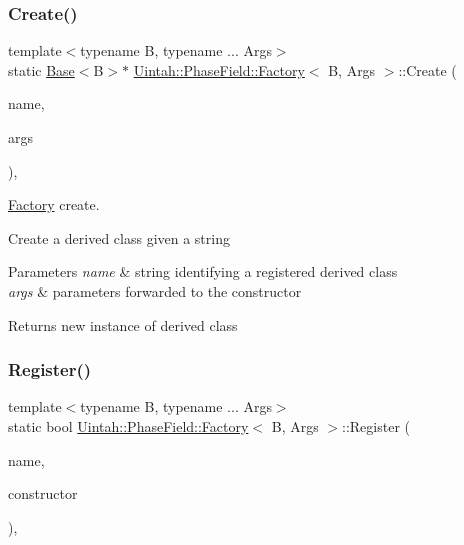 \subsubsection{\texorpdfstring{Create()}{Create()}}
{\footnotesize\ttfamily template$<$typename B, typename ... Args$>$ \\
static \hyperlink{classUintah_1_1PhaseField_1_1Base}{Base}$<$B$>$$\ast$ \hyperlink{classUintah_1_1PhaseField_1_1Factory}{Uintah\+::\+Phase\+Field\+::\+Factory}$<$ B, Args $>$\+::Create (\begin{DoxyParamCaption}\item[{std\+::string}]{name,  }\item[{Args ...}]{args }\end{DoxyParamCaption})\hspace{0.3cm}{\ttfamily [inline]}, {\ttfamily [static]}}



\hyperlink{classUintah_1_1PhaseField_1_1Factory}{Factory} create. 

Create a derived class given a string


\begin{DoxyParams}{Parameters}
{\em name} & string identifying a registered derived class \\
\hline
{\em args} & parameters forwarded to the constructor \\
\hline
\end{DoxyParams}
\begin{DoxyReturn}{Returns}
new instance of derived class 
\end{DoxyReturn}
\mbox{\label{classUintah_1_1PhaseField_1_1Factory_a52c2dbc3f693413bbd5d1338fa01e3bf}} 
\subsubsection{\texorpdfstring{Register()}{Register()}}
{\footnotesize\ttfamily template$<$typename B, typename ... Args$>$ \\
static bool \hyperlink{classUintah_1_1PhaseField_1_1Factory}{Uintah\+::\+Phase\+Field\+::\+Factory}$<$ B, Args $>$\+::Register (\begin{DoxyParamCaption}\item[{std\+::string}]{name,  }\item[{\hyperlink{classUintah_1_1PhaseField_1_1Factory_a896fba2efac0d82ed579b9b0772936f9}{Factory\+Method}}]{constructor }\end{DoxyParamCaption})\hspace{0.3cm}{\ttfamily [inline]}, {\ttfamily [static]}}



